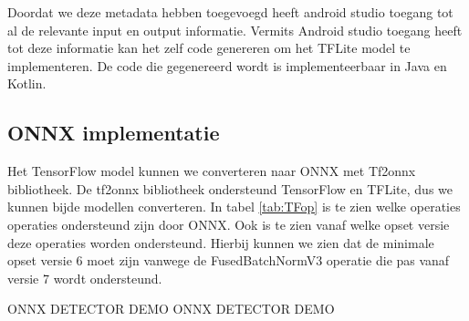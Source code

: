 Doordat we deze metadata hebben toegevoegd heeft android studio toegang tot al de relevante input en output informatie.
Vermits Android studio toegang heeft tot deze informatie kan het zelf code genereren om het TFLite model te implementeren.
De code die gegenereerd wordt is implementeerbaar in Java en Kotlin.

\subsection{ONNX implementatie}
Het TensorFlow model kunnen we converteren naar ONNX met Tf2onnx bibliotheek.
De tf2onnx bibliotheek ondersteund TensorFlow en TFLite, dus we kunnen bijde modellen converteren.
In tabel \ref{tab:TFop} is te zien welke operaties operaties ondersteund zijn door ONNX.
Ook is te zien vanaf welke opset versie deze operaties worden ondersteund.
Hierbij kunnen we zien dat de minimale opset versie 6 moet zijn vanwege de FusedBatchNormV3 operatie die pas vanaf versie 7 wordt ondersteund.


ONNX DETECTOR DEMO
ONNX DETECTOR DEMO


